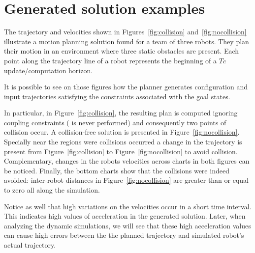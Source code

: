 \section{Generated solution examples}


The trajectory and velocities shown in Figures~\ref{fig:collision} and~\ref{fig:nocollision}
illustrate a motion planning solution found for a team of three robots.
They plan their motion in an environment where three static obstacles are present.
Each point along the trajectory line of a robot represents the beginning
of a $Tc$ update/computation horizon.

It is possible to see on those figures how the planner generates configuration and 
input trajectories satisfying the constraints associated with the goal states.

In particular, in Figure~\ref{fig:collision}, the resulting plan is computed ignoring 
coupling constraints ( is never performed) and consequently two points of collision occur.
A collision-free solution is presented in Figure~\ref{fig:nocollision}.
Specially near the regions were collisions occurred a change in the trajectory is present from Figure~\ref{fig:collision} to Figure~\ref{fig:nocollision} to avoid collision. 
Complementary, changes 
in the robots velocities across charts in both figures can be noticed. Finally, the 
bottom charts show that the collisions were indeed avoided: inter-robot distances in 
Figure~\ref{fig:nocollision} are greater than or equal to zero all along the 
simulation.

Notice as well that high variations on the velocities occur in a short time interval. This indicates high values of acceleration in the generated solution. %
Later, when analyzing the dynamic simulations, we will see that these high acceleration values can cause high errors between the the planned trajectory and simulated robot's actual trajectory.




